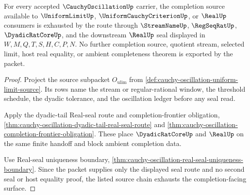 \begin{theorem}
\label{thm:cauchy-oscillation-completion-source-exhaustion}
For every accepted $\CauchyOscillationUp$ carrier, the completion source available to $\UniformLimitUp$, $\UniformCauchyCriterionUp$, or $\RealUp$ consumers is exhausted by the route through $\StreamNameUp$, $\RegSeqRatUp$, $\DyadicRatCoreUp$, and the downstream $\RealUp$ seal displayed in $W,M,Q,T,S,H,C,P,N$. No further completion source, quotient stream, selected limit, host real equality, or ambient completeness theorem is exported by the packet.
\end{theorem}
\begin{proof}
Project the source subpacket $O_{\mathrm{ulim}}$ from \autoref{def:cauchy-oscillation-uniform-limit-source}. Its rows name the stream or regular-rational window, the threshold schedule, the dyadic tolerance, and the oscillation ledger before any seal read.

Apply the dyadic-tail Real-seal route and completion-frontier obligation, \autoref{thm:cauchy-oscillation-dyadic-tail-real-seal-route} and \autoref{thm:cauchy-oscillation-completion-frontier-obligation}. These place $\DyadicRatCoreUp$ and $\RealUp$ on the same finite handoff and block ambient completion data.

Use Real-seal uniqueness boundary, \autoref{thm:cauchy-oscillation-real-seal-uniqueness-boundary}. Since the packet supplies only the displayed seal route and no second seal or host equality proof, the listed source chain exhausts the completion-facing surface.
\end{proof}


